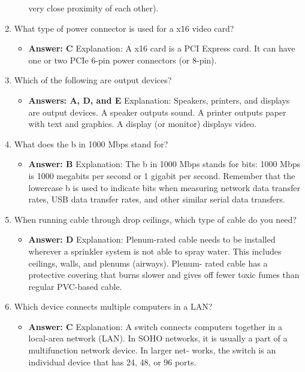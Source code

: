 \documentclass{article}
\begin{document}
\begin{enumerate}
\begin{itemize}
very close proximity of each other).
    \end{itemize}
    \item What type of power connector is used for a x16 video card? 
    \begin{itemize}
        \item \textbf{Answer: C}
Explanation: A x16 card is a PCI Express card. It can have one or two PCIe 6-pin
power connectors (or 8-pin).
    \end{itemize}
    \item Which of the following are output devices? 
    \begin{itemize}
        \item \textbf{Answers: A, D, and E}
Explanation: Speakers, printers, and displays are output devices. A speaker outputs
sound. A printer outputs paper with text and graphics. A display (or monitor) displays
video.
    \end{itemize}
    \item What does the b in 1000 Mbps stand for? 
    \begin{itemize}
        \item \textbf{Answer: B}
Explanation: The b in 1000 Mbps stands for bits: 1000 Mbps is 1000 megabits per
second or 1 gigabit per second. Remember that the lowercase b is used to indicate bits
when measuring network data transfer rates, USB data transfer rates, and other similar
serial data transfers.
    \end{itemize}
    \item When running cable through drop ceilings, which type of cable do
you need?
    \begin{itemize}
        \item \textbf{Answer: D}
Explanation: Plenum-rated cable needs to be installed wherever a sprinkler system is
not able to spray water. This includes ceilings, walls, and plenums (airways). Plenum-
rated cable has a protective covering that burns slower and gives off fewer toxic fumes
than regular PVC-based cable.
    \end{itemize}
    \item Which device connects multiple computers in a LAN?
    \begin{itemize}
        \item \textbf{Answer: C}
Explanation: A switch connects computers together in a local-area network (LAN). In
SOHO networks, it is usually a part of a multifunction network device. In larger net-
works, the switch is an individual device that has 24, 48, or 96 ports.

\end{itemize}
\end{enumerate}
\end{document}
